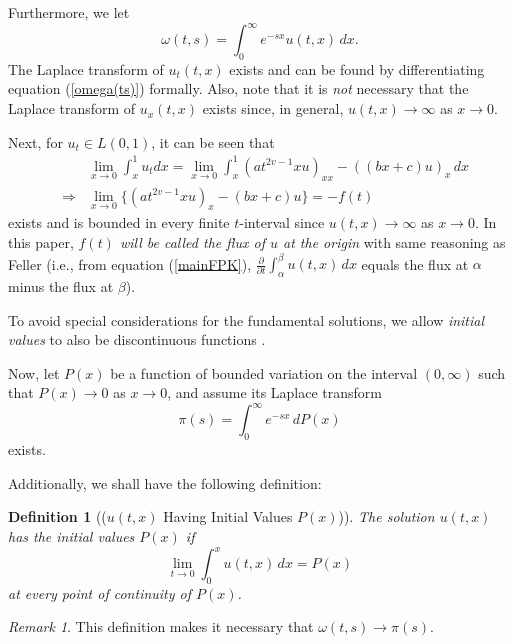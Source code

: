 \documentclass[preprint, 12pt]{elsarticle}
\numberwithin{equation}{section}
\theoremstyle{plain}
\newtheorem{definition}{Definition}[section]
\theoremstyle{remark}
\newtheorem{remark}{Remark}[section]
\begin{document}
Furthermore, we let
\begin{equation}
\omega (t, s) = \int_0^{\infty}{ e^{- s x} u (t, x)\,d x} \label{omega(ts)}.
\end{equation}
The Laplace transform of $u_t (t, x)$ exists and can be found by differentiating equation (\ref{omega(ts)}) formally. Also, note that it is \emph{not} necessary that the Laplace transform of $u_x (t, x)$ exists since, in general, $u (t, x) \rightarrow \infty$ as $x \rightarrow 0$.

Next, for $u_t \in L (0, 1)$, it can be seen that
\begin{eqnarray}
& & \lim_{x \rightarrow 0} \int_x^1{ u_t d x}  = \lim_{x \rightarrow 0}
\int_x^1{ (a t^{2 v - 1} x u)_{x x} - ((b x + c) u)_x\, d x} \nonumber \\
& \Longrightarrow & \lim_{x \rightarrow 0} \{ (a t^{2 v - 1} x u)_x - (b x + c) u \} = - f (t) \label{limx0}
\end{eqnarray}
exists and is bounded in every finite $t$-interval since $u(t,x) \rightarrow \infty$ as $x \rightarrow 0$. 
In this paper,
\textit{$f (t)$ will be called the flux of $u$ at the origin} with same reasoning as Feller \citep{Feller}(i.e., from equation (\ref{mainFPK}),
$\displaystyle{\frac{\partial}{\partial t}  \int_{\alpha}^{\beta} u (t, x)\, d x}$ equals the flux at $\alpha$ minus the flux at $\beta$).

To avoid special considerations for the fundamental solutions, we allow \textit{initial values} to also be discontinuous functions \citep{Feller}.

Now, let $P (x)$ be a function of bounded variation on the interval $(0, \infty)$ such that $P (x) \rightarrow 0$ as $x \rightarrow 0$, and assume its Laplace transform
\begin{equation}
\pi (s) = \int_0^{\infty} e^{- s x}\, d P (x) \label{pis}
\end{equation}
exists.

Additionally, we shall have the following definition:

\begin{definition}[($u (t, x)$ Having Initial Values $P (x)$)]
The solution $u (t, x)$ has the initial values $P (x)$ if
\[ \lim_{t \rightarrow 0} \int_0^x u (t, x)\, d x = P (x) \]
at every point of continuity of $P (x)$.
\end{definition}

\begin{remark} 
This definition makes it necessary that $\omega (t, s) \rightarrow \pi (s)$.
\end{remark}
\end{document}
